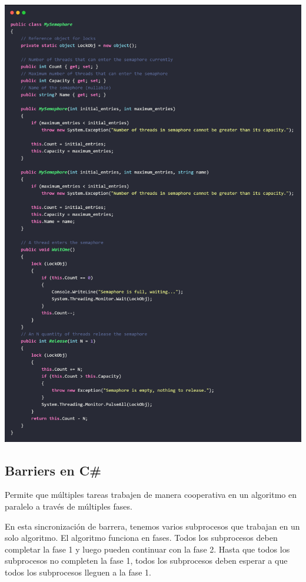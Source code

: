 \documentclass[10pt]{article} %
\begin{document}
\includegraphics[width=15cm]{MySemaphore.jpg}

\subsection{Barriers en C\#}

Permite que múltiples tareas trabajen de manera cooperativa en un algoritmo en paralelo a través de múltiples fases.

En esta sincronización de barrera, tenemos varios subprocesos que trabajan en un solo algoritmo. El algoritmo funciona en fases. Todos los subprocesos deben completar la fase 1 y luego pueden continuar con la fase 2. Hasta que todos los subprocesos no completen la fase 1, todos los subprocesos deben esperar a que todos los subprocesos lleguen a la fase 1.
\end{document}
